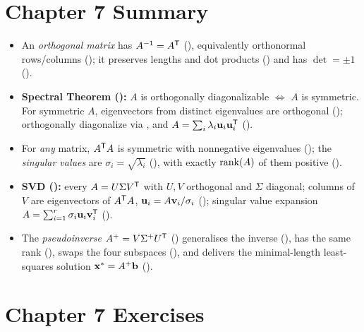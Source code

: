 \section*{Chapter 7 Summary}
\begin{itemize}[leftmargin=1.4em,itemsep=2pt]
\item An \emph{orthogonal matrix} has $A^{-1}=A^{\mathsf{T}}$ (), equivalently orthonormal rows/columns (); it preserves lengths and dot products () and has $\det=\pm1$ ().
\item \textbf{Spectral Theorem ():} $A$ is orthogonally diagonalizable $\iff$ $A$ is symmetric. For symmetric $A$, eigenvectors from distinct eigenvalues are orthogonal (); orthogonally diagonalize via , and $A=\sum_i\lambda_i\mathbf{u}_i\mathbf{u}_i^{\mathsf{T}}$ ().
\item For \emph{any} matrix, $A^{\mathsf{T}} A$ is symmetric with nonnegative eigenvalues (); the \emph{singular values} are $\sigma_i=\sqrt{\lambda_i}$ (), with exactly $\operatorname{rank}(A)$ of them positive ().
\item \textbf{SVD ():} every $A=U\Sigma V^{\mathsf{T}}$ with $U,V$ orthogonal and $\Sigma$ diagonal; columns of $V$ are eigenvectors of $A^{\mathsf{T}} A$, $\mathbf{u}_i=A\mathbf{v}_i/\sigma_i$ (); singular value expansion $A=\sum_{i=1}^r\sigma_i\mathbf{u}_i\mathbf{v}_i^{\mathsf{T}}$ ().
\item The \emph{pseudoinverse} $A^+=V\Sigma^+U^{\mathsf{T}}$ () generalises the inverse (), has the same rank (), swaps the four subspaces (), and delivers the minimal-length least-squares solution $\mathbf{x}^*=A^+\mathbf{b}$ ().
\end{itemize}

\section*{Chapter 7 Exercises}

